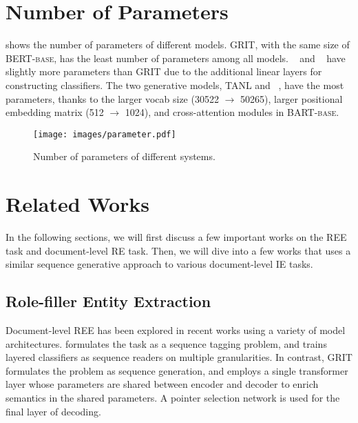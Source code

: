 \documentclass[11pt]{article}
\begin{document}
\section{Number of Parameters}
 shows the number of parameters of different models. GRIT, with the same size of \textsc{BERT-base}, has the least number of parameters among all models. \dygiepp~ and \scirexpipeline~ have slightly more parameters than GRIT due to the additional linear layers for constructing classifiers. The two generative models, TANL and \modelshort~, have the most parameters, thanks to the larger vocab size (30522 $\rightarrow$ 50265), larger positional embedding matrix (512 $\rightarrow$ 1024), and cross-attention modules in \textsc{BART-base}.
\begin{figure}[h]
    \centering
    \texttt{[image: images/parameter.pdf]}
    \caption{Number of parameters of different systems.}
    \vspace{-4mm}
    \label{fig:parameters}
\end{figure}
















%
 \section{Related Works}
In the following sections, we will first discuss a few important works on the REE task and document-level RE task. Then, we will dive into a few works that uses a similar sequence generative approach to various document-level IE tasks.



\subsection{Role-filler Entity Extraction}
Document-level REE has been explored in recent works using a variety of model architectures. \citet{du2020document} formulates the task as a sequence tagging problem, and trains layered classifiers as sequence readers on multiple granularities. In contrast, GRIT \cite{du-2020-grit} formulates the problem as sequence generation, and employs a single transformer layer whose parameters are shared between encoder and decoder to enrich semantics in the shared parameters. A pointer selection network is used for the final layer of decoding. 
\end{document}
